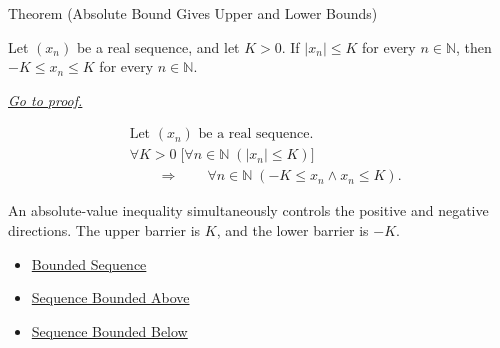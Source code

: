 
\begin{theorembox}{Theorem (Absolute Bound Gives Upper and Lower Bounds)}
\begin{theorem}
\label{thm:absolute-bound-gives-upper-and-lower-bounds}
Let $(x_n)$ be a real sequence, and let $K > 0$. If $|x_n| \le K$ for every
$n \in \mathbb{N}$, then $-K \le x_n \le K$ for every
$n \in \mathbb{N}$.

\smallskip
\noindent
\hyperref[prf:absolute-bound-gives-upper-and-lower-bounds]{\textit{Go to proof.}}
\end{theorem}
\end{theorembox}

\begin{remark*}
\[
\begin{aligned}
&\text{Let } (x_n) \text{ be a real sequence.}\\
&\forall K > 0\;
\bigl[
\forall n \in \mathbb{N}\;(|x_n| \le K)
\bigr]\\
&\qquad\Longrightarrow\qquad
\forall n \in \mathbb{N}\;(-K \le x_n \land x_n \le K).
\end{aligned}
\]
\end{remark*}

\begin{remark*}[Interpretation]
An absolute-value inequality simultaneously controls the positive and negative
directions. The upper barrier is $K$, and the lower barrier is $-K$.
\end{remark*}

\begin{dependencies}
\begin{itemize}
  \item \hyperref[def:bounded-sequence]{Bounded Sequence}
  \item \hyperref[def:sequence-bounded-above]{Sequence Bounded Above}
  \item \hyperref[def:sequence-bounded-below]{Sequence Bounded Below}
\end{itemize}
\end{dependencies}


